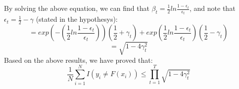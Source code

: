 By solving the above equation, we can find that $\beta_t = \frac{1}{2}ln\frac{1-\epsilon_t}{\epsilon_t}$, and note that $\epsilon_t = \frac{1}{2} - \gamma$ (stated in the hypothesys):
\begin{equation*}
	= exp(-( \frac{1}{2}ln\frac{1-\epsilon_t}{\epsilon_t}))(\frac{1}{2}+\gamma_t) + exp( \frac{1}{2}ln\frac{1-\epsilon_t}{\epsilon_t})(\frac{1}{2}-\gamma_t)
\end{equation*} 
\begin{equation*}
	= \sqrt{1-4\gamma_t^2}
\end{equation*}
Based on the above results, we have proved that:
\begin{equation*}
	\frac{1}{N}\sum_{i=1}^{N}I(y_i\neq F(x_i)) \leq \prod_{t=1}^{T}\sqrt{1 - 4\gamma^2_t}
\end{equation*}
